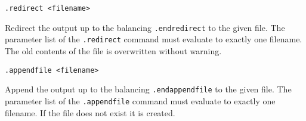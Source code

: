 \begin{verbatim}
.redirect <filename>
\end{verbatim}
\begin{desc}
Redirect the output up to the balancing \verb'.endredirect' to the given
file.
The parameter list of the \verb'.redirect' command must evaluate to
exactly one filename.
The old contents of the file is overwritten without warning.
\end{desc}
\begin{verbatim}
.appendfile <filename>
\end{verbatim}
\begin{desc}
Append the output up to the balancing \verb'.endappendfile' to the given
file. The parameter list of the \verb'.appendfile' command must evaluate
to exactly one filename. If the file does not exist it is created.
\end{desc}
